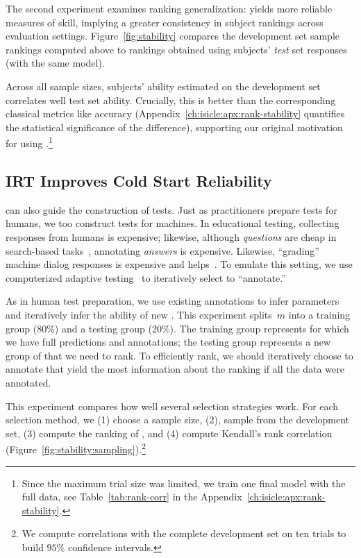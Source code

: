 The second experiment examines ranking generalization: \irt{} yields more reliable measures of \subj{} skill,  implying a greater consistency in subject rankings across evaluation settings.
Figure~\ref{fig:stability} compares the development set sample rankings computed above to rankings obtained using subjects' \emph{test} set responses (with the same \irt{} model).

Across all sample sizes, subjects' \irt{} ability estimated on the
development set correlates well test set ability.
Crucially, this is better than the corresponding classical metrics
like accuracy (Appendix~\ref{ch:isicle:apx:rank-stability} quantifies
the statistical significance of the difference), supporting our
original motivation for using \irt{}.\footnote{ Since the maximum trial size was
    limited, we train one final model with the full data, see
    Table~\ref{tab:rank-corr} in the
    Appendix~\ref{ch:isicle:apx:rank-stability}.  }

\subsection{IRT Improves Cold Start Reliability}
\label{ch:isicle:sampling}

\irt{} can also guide the construction of tests.
Just as \irt{} practitioners prepare tests for humans, we too construct tests for machines.
In educational testing, collecting responses from humans is expensive; likewise, although \emph{questions} are cheap in search-based \qa{} tasks~\citep{Nguyen2016MSMA,kwiatkowski2019nq}, annotating \emph{answers} is expensive.
Likewise, ``grading'' machine dialog responses is expensive and \irt{} helps~\citep{sedoc2020irt}.
To emulate this setting, we use computerized adaptive testing~\citep{weiss1984cat} to iteratively select \squad{} \itms{} to ``annotate.''

As in human test preparation, we use existing annotations to infer
\itm{} parameters and iteratively infer the ability of new \subjs{}.
This experiment splits~$m$ \subjs{} into a training group (80\%) and a
testing group (20\%).
The training group represents \subjs{} for which we have full \itm{}
predictions and annotations; the testing group represents a new group
of \subjs{} that we need to rank.
To efficiently rank, we should iteratively choose \itms{} to annotate that yield the most information about the ranking if all the data were annotated.

This experiment compares how well several \itm{} selection strategies work.
For each selection method, we (1) choose a sample size, (2), sample
from the development set, (3) compute the ranking of \subjs{}, and (4)
compute Kendall's rank correlation
(Figure~\ref{fig:stability:sampling}).\footnote{We compute correlations with the complete development set on ten trials to build $95\%$ confidence intervals.}


